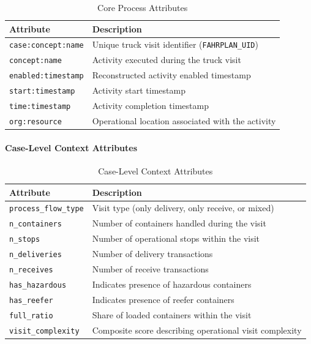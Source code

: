    \begin{table}[H] 
   \centering 
   \caption{Core Process Attributes} 
   \begin{tabular}{p{4cm} p{9cm}} 
   \hline \textbf{Attribute} & \textbf{Description} \\ \hline \texttt{case:concept:name} & Unique truck visit identifier (\texttt{FAHRPLAN\_UID}) \\ \texttt{concept:name} & Activity executed during the truck visit \\ \texttt{enabled:timestamp} & Reconstructed activity enabled timestamp \\ \texttt{start:timestamp} & Activity start timestamp \\ \texttt{time:timestamp} & Activity completion timestamp \\ \texttt{org:resource} & Operational location associated with the activity \\ \hline 
   \end{tabular} 
   \end{table}

   \paragraph{Case-Level Context Attributes} 
   
   \begin{table}[h] 
   \centering 
   \caption{Case-Level Context Attributes} 
   \begin{tabular}{p{4cm} p{9cm}} 
   \hline \textbf{Attribute} & \textbf{Description} \\ \hline \texttt{process\_flow\_type} & Visit type (only delivery, only receive, or mixed) \\ \texttt{n\_containers} & Number of containers handled during the visit \\ \texttt{n\_stops} & Number of operational stops within the visit \\ \texttt{n\_deliveries} & Number of delivery transactions \\ \texttt{n\_receives} & Number of receive transactions \\ \texttt{has\_hazardous} & Indicates presence of hazardous containers \\ \texttt{has\_reefer} & Indicates presence of reefer containers \\ \texttt{full\_ratio} & Share of loaded containers within the visit \\ \texttt{visit\_complexity} & Composite score describing operational visit complexity \\ \hline 
   \end{tabular} 
   \end{table}

